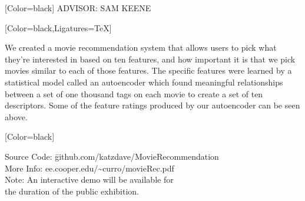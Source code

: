 \documentclass{article}
\begin{document}
{
[Color=black]
\fontsize{0.8in}{1em}\selectfont 
\noindent ADVISOR: SAM KEENE
}
\vspace{0.8in}\\
\begin{minipage}{11in}
{
	[Color=black,Ligatures=TeX]
	\fontsize{0.58in}{6em}\selectfont

	We created a movie recommendation system that allows users to pick what
	they're interested in based on ten features, and how important it is that we
	pick movies similar to each of those features. The specific features were
	learned by a statistical model called an autoencoder which found
	meaningful relationships between a set of one thousand tags on each movie
	to create a set of ten descriptors. Some of the feature ratings produced by
	our autoencoder can be seen above.


}
\end{minipage} 
\hfill
\begin{minipage}{8in}
{
	[Color=black]
	\fontsize{0.55in}{5.5em}\selectfont
	\begin{tabbing}
	Source Code: \= github.com/katzdave/MovieRecommendation\\
	More Info: \> ee.cooper.edu/\textasciitilde{}curro/movieRec.pdf\\
	Note: \> An interactive demo will be available for \\ \> the duration of the public exhibition.
	\end{tabbing}
}
\end{minipage} 
\end{document}
